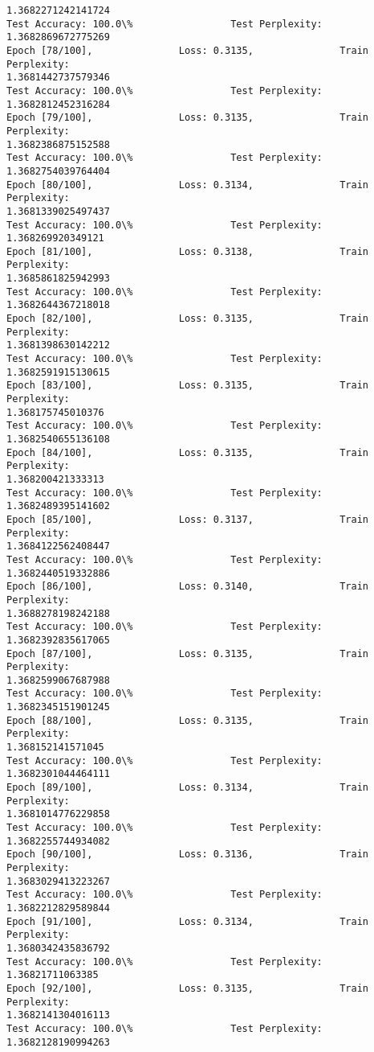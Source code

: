 \documentclass[11pt]{article}
\begin{document}
\begin{Verbatim}[commandchars=\\\{\}]
1.3682271242141724
Test Accuracy: 100.0\%                 Test Perplexity: 1.3682869672775269
Epoch [78/100],               Loss: 0.3135,               Train Perplexity:
1.3681442737579346
Test Accuracy: 100.0\%                 Test Perplexity: 1.3682812452316284
Epoch [79/100],               Loss: 0.3135,               Train Perplexity:
1.3682386875152588
Test Accuracy: 100.0\%                 Test Perplexity: 1.3682754039764404
Epoch [80/100],               Loss: 0.3134,               Train Perplexity:
1.3681339025497437
Test Accuracy: 100.0\%                 Test Perplexity: 1.368269920349121
Epoch [81/100],               Loss: 0.3138,               Train Perplexity:
1.3685861825942993
Test Accuracy: 100.0\%                 Test Perplexity: 1.3682644367218018
Epoch [82/100],               Loss: 0.3135,               Train Perplexity:
1.3681398630142212
Test Accuracy: 100.0\%                 Test Perplexity: 1.3682591915130615
Epoch [83/100],               Loss: 0.3135,               Train Perplexity:
1.368175745010376
Test Accuracy: 100.0\%                 Test Perplexity: 1.3682540655136108
Epoch [84/100],               Loss: 0.3135,               Train Perplexity:
1.368200421333313
Test Accuracy: 100.0\%                 Test Perplexity: 1.3682489395141602
Epoch [85/100],               Loss: 0.3137,               Train Perplexity:
1.3684122562408447
Test Accuracy: 100.0\%                 Test Perplexity: 1.3682440519332886
Epoch [86/100],               Loss: 0.3140,               Train Perplexity:
1.3688278198242188
Test Accuracy: 100.0\%                 Test Perplexity: 1.3682392835617065
Epoch [87/100],               Loss: 0.3135,               Train Perplexity:
1.3682599067687988
Test Accuracy: 100.0\%                 Test Perplexity: 1.3682345151901245
Epoch [88/100],               Loss: 0.3135,               Train Perplexity:
1.368152141571045
Test Accuracy: 100.0\%                 Test Perplexity: 1.3682301044464111
Epoch [89/100],               Loss: 0.3134,               Train Perplexity:
1.3681014776229858
Test Accuracy: 100.0\%                 Test Perplexity: 1.3682255744934082
Epoch [90/100],               Loss: 0.3136,               Train Perplexity:
1.3683029413223267
Test Accuracy: 100.0\%                 Test Perplexity: 1.3682212829589844
Epoch [91/100],               Loss: 0.3134,               Train Perplexity:
1.3680342435836792
Test Accuracy: 100.0\%                 Test Perplexity: 1.36821711063385
Epoch [92/100],               Loss: 0.3135,               Train Perplexity:
1.3682141304016113
Test Accuracy: 100.0\%                 Test Perplexity: 1.3682128190994263

\end{Verbatim}
\end{document}
